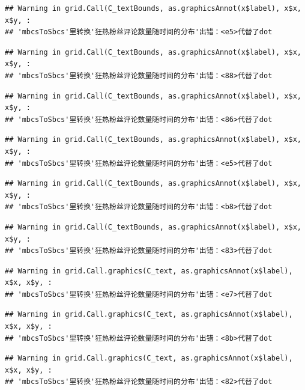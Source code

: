 \documentclass[
]{article}
\begin{document}
\begin{verbatim}
## Warning in grid.Call(C_textBounds, as.graphicsAnnot(x$label), x$x, x$y, :
## 'mbcsToSbcs'里转换'狂热粉丝评论数量随时间的分布'出错：<e5>代替了dot
\end{verbatim}

\begin{verbatim}
## Warning in grid.Call(C_textBounds, as.graphicsAnnot(x$label), x$x, x$y, :
## 'mbcsToSbcs'里转换'狂热粉丝评论数量随时间的分布'出错：<88>代替了dot
\end{verbatim}

\begin{verbatim}
## Warning in grid.Call(C_textBounds, as.graphicsAnnot(x$label), x$x, x$y, :
## 'mbcsToSbcs'里转换'狂热粉丝评论数量随时间的分布'出错：<86>代替了dot
\end{verbatim}

\begin{verbatim}
## Warning in grid.Call(C_textBounds, as.graphicsAnnot(x$label), x$x, x$y, :
## 'mbcsToSbcs'里转换'狂热粉丝评论数量随时间的分布'出错：<e5>代替了dot
\end{verbatim}

\begin{verbatim}
## Warning in grid.Call(C_textBounds, as.graphicsAnnot(x$label), x$x, x$y, :
## 'mbcsToSbcs'里转换'狂热粉丝评论数量随时间的分布'出错：<b8>代替了dot
\end{verbatim}

\begin{verbatim}
## Warning in grid.Call(C_textBounds, as.graphicsAnnot(x$label), x$x, x$y, :
## 'mbcsToSbcs'里转换'狂热粉丝评论数量随时间的分布'出错：<83>代替了dot
\end{verbatim}

\begin{verbatim}
## Warning in grid.Call.graphics(C_text, as.graphicsAnnot(x$label), x$x, x$y, :
## 'mbcsToSbcs'里转换'狂热粉丝评论数量随时间的分布'出错：<e7>代替了dot
\end{verbatim}

\begin{verbatim}
## Warning in grid.Call.graphics(C_text, as.graphicsAnnot(x$label), x$x, x$y, :
## 'mbcsToSbcs'里转换'狂热粉丝评论数量随时间的分布'出错：<8b>代替了dot
\end{verbatim}

\begin{verbatim}
## Warning in grid.Call.graphics(C_text, as.graphicsAnnot(x$label), x$x, x$y, :
## 'mbcsToSbcs'里转换'狂热粉丝评论数量随时间的分布'出错：<82>代替了dot
\end{verbatim}
\end{document}
